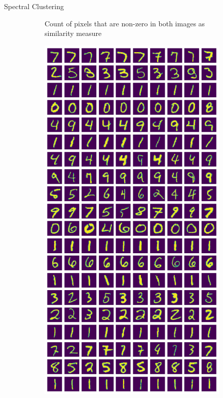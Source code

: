 \documentclass[10pt,a4paper, nocenter]{beamer}
\begin{document}
\begin{frame}{Spectral Clustering}
\begin{figure}[h]
\begin{center}
\begin{subfigure}[b]{0.4\textwidth}
				\caption{Count of pixels that are non-zero in both images as similarity measure}
				\label{fig:clustering_20_0norm}
			\end{subfigure}
			\begin{subfigure}[b]{0.4\textwidth}
				\centering
				\includegraphics[height={0.6\textheight}]{../../images/number_clustering_20_2norm.png}

\end{subfigure}
\end{center}
\end{figure}
\end{frame}
\end{document}
